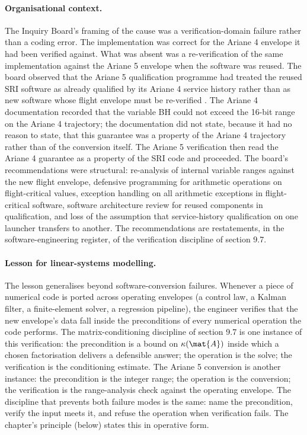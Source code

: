 \paragraph{Organisational context.}
The Inquiry Board's framing of the cause was a verification-domain
failure rather than a coding error. The implementation was correct
for the Ariane 4 envelope it had been verified against. What was
absent was a re-verification of the same implementation against the
Ariane 5 envelope when the software was reused. The board observed
that the Ariane 5 qualification programme had treated the reused
SRI software as already qualified by its Ariane 4 service history
rather than as new software whose flight envelope must be
re-verified \cite{acc:ariane501-ifr}. The Ariane 4 documentation
recorded that the variable BH could not exceed the 16-bit range on
the Ariane 4 trajectory; the documentation did not state, because
it had no reason to state, that this guarantee was a property of
the Ariane 4 trajectory rather than of the conversion itself. The
Ariane 5 verification then read the Ariane 4 guarantee as a
property of the SRI code and proceeded. The board's recommendations
were structural: re-analysis of internal variable ranges against
the new flight envelope, defensive programming for arithmetic
operations on flight-critical values, exception handling on all
arithmetic exceptions in flight-critical software, software
architecture review for reused components in qualification, and
loss of the assumption that service-history qualification on one
launcher transfers to another. The recommendations are
restatements, in the software-engineering register, of the
verification discipline of section 9.7.

\paragraph{Lesson for linear-systems modelling.}
The lesson generalises beyond software-conversion failures.
Whenever a piece of numerical code is ported across operating
envelopes (a control law, a Kalman filter, a finite-element solver,
a regression pipeline), the engineer verifies that the new
envelope's data fall inside the preconditions of every numerical
operation the code performs. The matrix-conditioning discipline of
section 9.7 is one instance of this verification: the precondition
is a bound on $\kappa(\mat{A})$ inside which a chosen factorisation
delivers a defensible answer; the operation is the solve; the
verification is the conditioning estimate. The Ariane 5 conversion
is another instance: the precondition is the integer range; the
operation is the conversion; the verification is the
range-analysis check against the operating envelope. The
discipline that prevents both failure modes is the same: name the
precondition, verify the input meets it, and refuse the operation
when verification fails. The chapter's principle (below) states
this in operative form.

